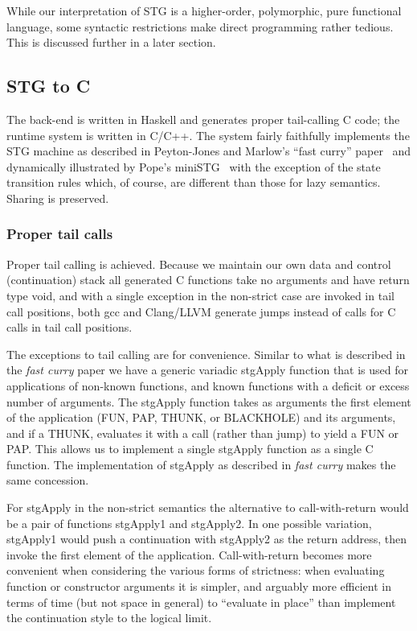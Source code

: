 \documentclass{llncs}
\begin{document}
While our interpretation of STG is a higher-order, polymorphic, pure functional
language, some syntactic restrictions make direct programming rather tedious.
This is discussed further in a later section.

\subsection{STG to C}

The back-end is written in Haskell and generates proper tail-calling C code;
the runtime system is written in C/C++.  The system fairly faithfully
implements the STG machine as described in Peyton-Jones and Marlow's ``fast
curry'' paper~\cite{fastcurry} and dynamically illustrated by Pope's
miniSTG~\cite{ministg} with the exception of the state transition rules which,
of course, are different than those for lazy semantics.  Sharing is preserved.

\subsubsection{Proper tail calls}

Proper tail calling is achieved.  Because we maintain our own data and control
(continuation) stack all generated C functions take no arguments and have
return type void, and with a single exception in the non-strict case are
invoked in tail call positions, both gcc and Clang/LLVM generate jumps instead
of calls for C calls in tail call positions.

The exceptions to tail calling are for convenience.  Similar to what is
described in the \emph{fast curry} paper we have a generic variadic stgApply
function that is used for applications of non-known functions, and known
functions with a deficit or excess number of arguments.  The stgApply function
takes as arguments the first element of the application (FUN, PAP, THUNK, or
BLACKHOLE) and its arguments, and if a THUNK, evaluates it with a call (rather
than jump) to yield a FUN or PAP.  This allows us to implement a single
stgApply function as a single C function.  The implementation of stgApply as
described in \emph{fast curry} makes the same concession.

For stgApply in the non-strict semantics the alternative to call-with-return
would be a pair of functions stgApply1 and stgApply2.  In one possible variation, 
stgApply1 would push a continuation with stgApply2 as the return address, then
invoke the first element of the application.  Call-with-return becomes more
convenient when considering the various forms of strictness:  when evaluating
function or constructor arguments it is simpler, and arguably more efficient
in terms of time (but not space in general) to ``evaluate in place'' than
implement the continuation style to the logical limit.
\end{document}
